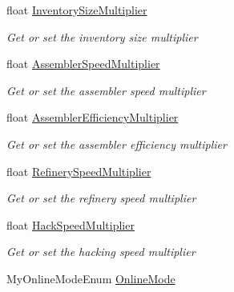 \begin{DoxyCompactItemize}
float \hyperlink{class_s_e_mod_a_p_i_1_1_a_p_i_1_1_definitions_1_1_dedicated_config_definition_a92d726af3abc5d6e9815ef12ecfdd7f6}{Inventory\+Size\+Multiplier}
\begin{DoxyCompactList}\small\item\em Get or set the inventory size multiplier \end{DoxyCompactList}\item 
float \hyperlink{class_s_e_mod_a_p_i_1_1_a_p_i_1_1_definitions_1_1_dedicated_config_definition_a0346c85cc9576e12ccdb3f9f73db01c3}{Assembler\+Speed\+Multiplier}
\begin{DoxyCompactList}\small\item\em Get or set the assembler speed multiplier \end{DoxyCompactList}\item 
float \hyperlink{class_s_e_mod_a_p_i_1_1_a_p_i_1_1_definitions_1_1_dedicated_config_definition_a3536b5c5146e9c0a8e576e2534248f05}{Assembler\+Efficiency\+Multiplier}
\begin{DoxyCompactList}\small\item\em Get or set the assembler efficiency multiplier \end{DoxyCompactList}\item 
float \hyperlink{class_s_e_mod_a_p_i_1_1_a_p_i_1_1_definitions_1_1_dedicated_config_definition_a3e3cfaefe4e92f00cdafafd55569569f}{Refinery\+Speed\+Multiplier}
\begin{DoxyCompactList}\small\item\em Get or set the refinery speed multiplier \end{DoxyCompactList}\item 
float \hyperlink{class_s_e_mod_a_p_i_1_1_a_p_i_1_1_definitions_1_1_dedicated_config_definition_a0650151c1503943e42dca301cd22ac5a}{Hack\+Speed\+Multiplier}
\begin{DoxyCompactList}\small\item\em Get or set the hacking speed multiplier \end{DoxyCompactList}\item 
My\+Online\+Mode\+Enum \hyperlink{class_s_e_mod_a_p_i_1_1_a_p_i_1_1_definitions_1_1_dedicated_config_definition_a38cdea2bb46910958f6a8817a0a6296e}{Online\+Mode}

\end{DoxyCompactItemize}
